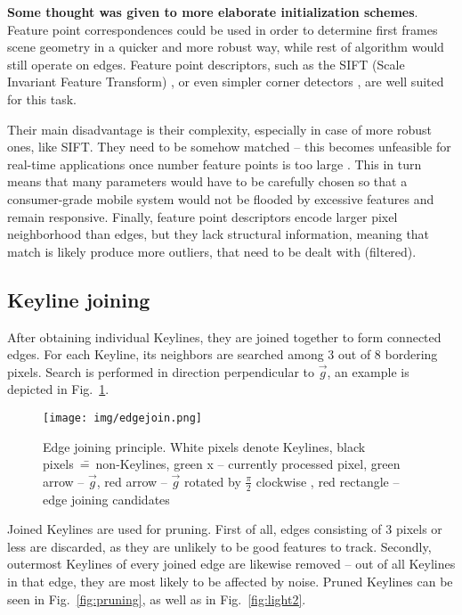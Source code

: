 \textbf{Some thought was given to more elaborate initialization schemes}. Feature point correspondences could be used in order to determine first frames scene geometry \cite{semi_dense} in a quicker and more robust way, while rest of algorithm would still operate on edges. Feature point descriptors, such as the SIFT (Scale Invariant Feature Transform) \cite{sift}, or even simpler corner detectors \cite{harris} \cite{shi1994good}, are well suited for this task.

Their main disadvantage is their complexity, especially in case of more robust ones, like SIFT. They need to be somehow matched -- this becomes unfeasible for real-time applications once number feature points is too large \cite{szczesny}. This in turn means that many parameters would have to be carefully chosen so that a consumer-grade mobile system would not be flooded by excessive features and remain responsive. Finally, feature point descriptors encode larger pixel neighborhood than edges, but they lack structural information, meaning that match is likely produce more outliers, that need to be dealt with (filtered).


\subsection{Keyline joining}

After obtaining individual Keylines, they are joined together to form connected edges.
For each Keyline, its neighbors are searched among 3 out of 8 bordering pixels. Search is performed in direction perpendicular to $\vec{g}$, an example is depicted in Fig.~\ref{fig:edgejoin}.

\begin{figure}[ht]
	\centering\texttt{[image: img/edgejoin.png]}
	\caption{ Edge joining principle. White pixels denote Keylines, black pixels~\==~non-Keylines, green x -- currently processed pixel, green arrow -- $\vec{g}$, red arrow -- $\vec{g}$ rotated by $\frac{\pi}{2}$ clockwise , red rectangle -- edge joining candidates }
	\label{fig:edgejoin}
\end{figure}


Joined Keylines are used for pruning. First of all, edges consisting of 3 pixels or less are discarded, as they are unlikely to be good features to track. Secondly, outermost Keylines of every joined edge are likewise removed -- out of all Keylines in that edge, they are most likely to be affected by noise. Pruned Keylines can be seen in Fig.~\ref{fig:pruning}, as well as in Fig.~\ref{fig:light2}.

